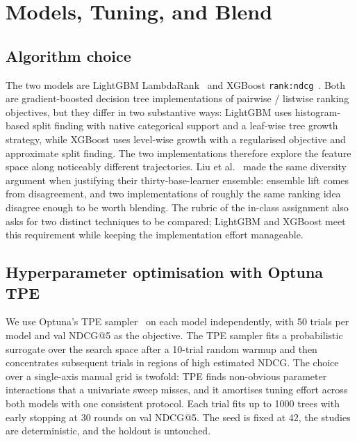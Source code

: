 \documentclass[runningheads]{llncs}
\begin{document}
\section{Models, Tuning, and Blend}\label{sec:models}

\subsection{Algorithm choice}

The two models are LightGBM LambdaRank~\cite{ke2017lightgbm} and XGBoost \texttt{rank:ndcg}~\cite{chen2016xgboost}. Both are gradient-boosted decision tree implementations of pairwise / listwise ranking objectives, but they differ in two substantive ways: LightGBM uses histogram-based split finding with native categorical support and a leaf-wise tree growth strategy, while XGBoost uses level-wise growth with a regularised objective and approximate split finding. The two implementations therefore explore the feature space along noticeably different trajectories. Liu et al.~\cite{liu2013expedia} made the same diversity argument when justifying their thirty-base-learner ensemble: ensemble lift comes from disagreement, and two implementations of roughly the same ranking idea disagree enough to be worth blending. The rubric of the in-class assignment also asks for two distinct techniques to be compared; LightGBM and XGBoost meet this requirement while keeping the implementation effort manageable.

\subsection{Hyperparameter optimisation with Optuna TPE}

We use Optuna's TPE sampler~\cite{bergstra2011tpe,akiba2019optuna} on each model independently, with 50 trials per model and val NDCG@5 as the objective. The TPE sampler fits a probabilistic surrogate over the search space after a 10-trial random warmup and then concentrates subsequent trials in regions of high estimated NDCG. The choice over a single-axis manual grid is twofold: TPE finds non-obvious parameter interactions that a univariate sweep misses, and it amortises tuning effort across both models with one consistent protocol. Each trial fits up to 1000 trees with early stopping at 30 rounds on val NDCG@5. The seed is fixed at 42, the studies are deterministic, and the holdout is untouched.
\end{document}
